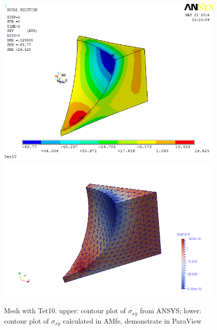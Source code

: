 \begin{figure}[htbp]
	\begin{center}
		\includegraphics[width=13cm,clip]{Tet10_Sxy.png} 		
		\includegraphics[width=13cm,clip]{Tet10_Sxy_P.png} 		
		\caption{Mesh with Tet10. upper: contour plot of $\sigma_{xy}$ from ANSYS; lower: contour plot of $\sigma_{xy}$ calculated in AMfe, demonstrate in ParaView} \label{fig: Tet10_Sxy}
	\end{center}
\end{figure}
\clearpage 

